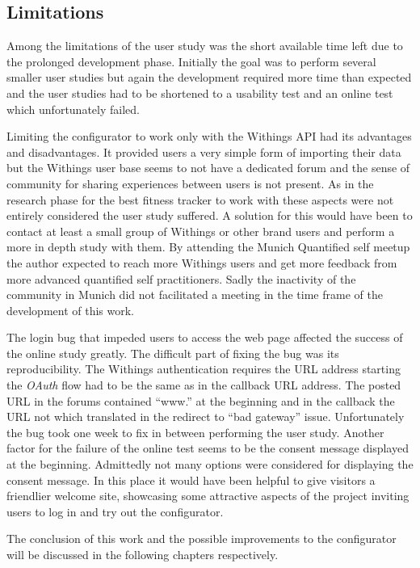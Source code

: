 \documentclass[../medieninformatik-arbeit.tex]{subfiles}
\begin{document}
\subsection{Limitations}
Among the limitations of the user study was the short available time left due to the prolonged development phase. Initially the goal was to perform several smaller user studies but again the development required more time than expected and the user studies had to be shortened to a usability test and an online test which unfortunately failed. 

Limiting the configurator to work only with the Withings API had its advantages and disadvantages. It provided users a very simple form of importing their data but the Withings user base seems to not have a dedicated forum and the sense of community for sharing experiences between users is not present. As in the research phase for the best fitness tracker to work with these aspects were not entirely considered the user study suffered. A solution for this would have been to contact at least a small group of Withings or other brand users and perform a more in depth study with them. By attending the Munich Quantified self meetup the author expected to reach more Withings users and get more feedback from more advanced quantified self practitioners. Sadly the inactivity of the community in Munich did not facilitated a meeting in the time frame of the development of this work. 

The login bug that impeded users to access the web page affected the success of the online study greatly. The difficult part of fixing the bug was its reproducibility. The Withings authentication requires the URL address starting the \textit{OAuth} flow had to be the same as in the callback URL address. The posted URL in the forums contained ``www.'' at the beginning and in the callback the URL not which translated in the redirect to ``bad gateway'' issue. Unfortunately the bug took one week to fix in between performing the user study. Another factor for the failure of the online test seems to be the consent message displayed at the beginning. Admittedly not many options were considered for displaying the consent message. In this place it would have been helpful to give visitors a friendlier welcome site, showcasing some attractive aspects of the project inviting users to log in and try out the configurator. 

The conclusion of this work and the possible improvements to the configurator will be discussed in the following chapters respectively. 
\end{document}
